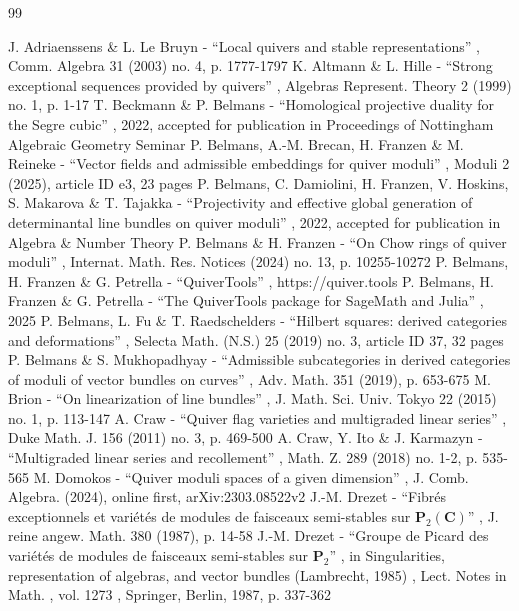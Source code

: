 \documentclass[11pt]{article}
\theoremstyle{plain}
\theoremstyle{definition}
\begin{document}
\begin{thebibliography}{99}\raggedright
{} J. Adriaenssens \& L. Le Bruyn - “Local quivers and stable representations” , Comm. Algebra 31 (2003) no. 4, p. 1777-1797
 K. Altmann \& L. Hille - “Strong exceptional sequences provided by quivers” , Algebras Represent. Theory 2 (1999) no. 1, p. 1-17
 T. Beckmann \& P. Belmans - “Homological projective duality for the Segre cubic” , 2022, accepted for publication in Proceedings of Nottingham Algebraic Geometry Seminar
 P. Belmans, A.-M. Brecan, H. Franzen \& M. Reineke - “Vector fields and admissible embeddings for quiver moduli” , Moduli 2 (2025), article ID e3, 23 pages
 P. Belmans, C. Damiolini, H. Franzen, V. Hoskins, S. Makarova \& T. Tajakka - “Projectivity and effective global generation of determinantal line bundles on quiver moduli” , 2022, accepted for publication in Algebra \& Number Theory
 P. Belmans \& H. Franzen - “On Chow rings of quiver moduli” , Internat. Math. Res. Notices (2024) no. 13, p. 10255-10272
 P. Belmans, H. Franzen \& G. Petrella - “QuiverTools” , https://quiver.tools
 P. Belmans, H. Franzen \& G. Petrella - “The QuiverTools package for SageMath and Julia” , 2025
 P. Belmans, L. Fu \& T. Raedschelders - “Hilbert squares: derived categories and deformations” , Selecta Math. (N.S.) 25 (2019) no. 3, article ID 37, 32 pages
 P. Belmans \& S. Mukhopadhyay - “Admissible subcategories in derived categories of moduli of vector bundles on curves” , Adv. Math. 351 (2019), p. 653-675
 M. Brion - “On linearization of line bundles” , J. Math. Sci. Univ. Tokyo 22 (2015) no. 1, p. 113-147
 A. Craw - “Quiver flag varieties and multigraded linear series” , Duke Math. J. 156 (2011) no. 3, p. 469-500
 A. Craw, Y. Ito \& J. Karmazyn - “Multigraded linear series and recollement” , Math. Z. 289 (2018) no. 1-2, p. 535-565
 M. Domokos - “Quiver moduli spaces of a given dimension” , J. Comb. Algebra. (2024), online first, arXiv:2303.08522v2
 J.-M. Drezet - “Fibrés exceptionnels et variétés de modules de faisceaux semi-stables sur ${\mathbf{P}}_2({\mathbf{C}})$” , J. reine angew. Math. 380 (1987), p. 14-58
 J.-M. Drezet - “Groupe de Picard des variétés de modules de faisceaux semi-stables sur ${\mathbf{P}}_2$” , in Singularities, representation of algebras, and vector bundles (Lambrecht, 1985) , Lect. Notes in Math. , vol. 1273 , Springer, Berlin, 1987, p. 337-362

\end{thebibliography}
\end{document}
